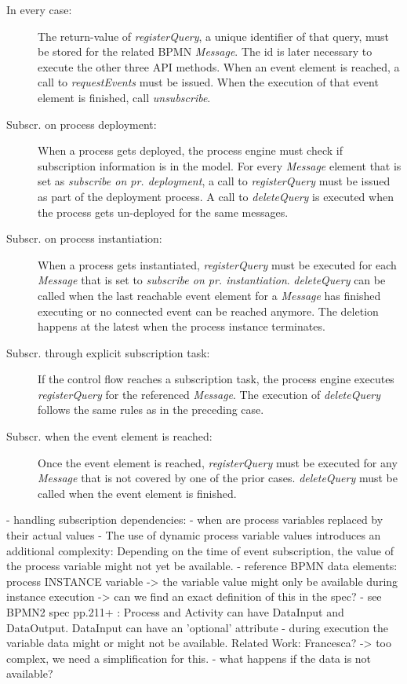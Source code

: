 \begin{description}
	\item[In every case:] 
		The return-value of \textit{registerQuery}, a unique identifier of that query, must be stored for the related BPMN \textit{Message}. The id is later necessary to execute the other three API methods.
		When an event element is reached, a call to \textit{requestEvents} must be issued. When the execution of that event element is finished, call \textit{unsubscribe}.
	\item[Subscr. on process deployment:]
		When a process gets deployed, the process engine must check if subscription information is in the model. For every \textit{Message} element that is set as \textit{subscribe on pr. deployment}, a call to \textit{registerQuery} must be issued as part of the deployment process. A call to \textit{deleteQuery} is executed when the process gets un-deployed for the same messages.
	\item[Subscr. on process instantiation:] 
		When a process gets instantiated, \textit{registerQuery} must be executed for each \textit{Message} that is set to \textit{subscribe on pr. instantiation}. \textit{deleteQuery} can be called when the last reachable event element for a \textit{Message} has finished executing or no connected event can be reached anymore. The deletion happens at the latest when the process instance terminates.
	\item[Subscr. through explicit subscription task:]
		If the control flow reaches a subscription task, the process engine executes \textit{registerQuery} for the referenced \textit{Message}. The execution of \textit{deleteQuery} follows the same rules as in the preceding case.
	\item[Subscr. when the event element is reached:]
		Once the event element is reached, \textit{registerQuery} must be executed for any \textit{Message} that is not covered by one of the prior cases. \textit{deleteQuery} must be called when the event element is finished.
\end{description}


- handling subscription dependencies:
- when are process variables replaced by their actual values
- The use of dynamic process variable values introduces an additional complexity: Depending on the time of event subscription, the value of the process variable might not yet be available.
- reference BPMN data elements: process INSTANCE variable
-> the variable value might only be available during instance execution
-> can we find an exact definition of this in the spec?
- see BPMN2 spec pp.211+ : Process and Activity can have DataInput and DataOutput. DataInput can have an 'optional' attribute
- during execution the variable data might or might not be available. Related Work: Francesca?
-> too complex, we need a simplification for this.
- what happens if the data is not available?



